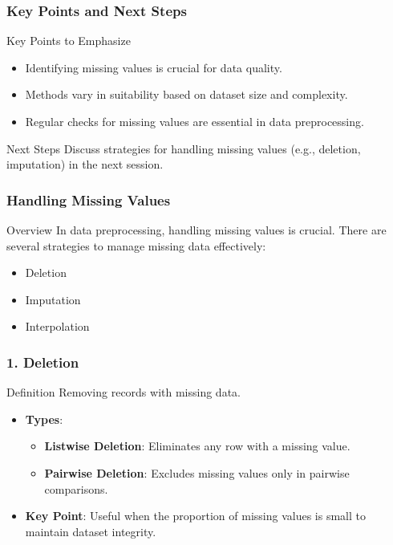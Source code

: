 \documentclass[aspectratio=169]{beamer}
\begin{document}
\begin{frame}[fragile]
  \frametitle{Key Points and Next Steps}
  \begin{block}{Key Points to Emphasize}
    \begin{itemize}
      \item Identifying missing values is crucial for data quality.
      \item Methods vary in suitability based on dataset size and complexity.
      \item Regular checks for missing values are essential in data preprocessing.
    \end{itemize}
  \end{block}
  \begin{block}{Next Steps}
    Discuss strategies for handling missing values (e.g., deletion, imputation) in the next session.
  \end{block}
\end{frame}

\begin{frame}[fragile]
    \frametitle{Handling Missing Values}
    \begin{block}{Overview}
        In data preprocessing, handling missing values is crucial. There are several strategies to manage missing data effectively:
    \end{block}
    \begin{itemize}
        \item Deletion
        \item Imputation
        \item Interpolation
    \end{itemize}
\end{frame}

\begin{frame}[fragile]
    \frametitle{1. Deletion}
    \begin{block}{Definition}
        Removing records with missing data.
    \end{block}
    \begin{itemize}
        \item \textbf{Types}:
        \begin{itemize}
            \item \textbf{Listwise Deletion}: Eliminates any row with a missing value.
            \item \textbf{Pairwise Deletion}: Excludes missing values only in pairwise comparisons.
        \end{itemize}
        \item \textbf{Key Point}: Useful when the proportion of missing values is small to maintain dataset integrity.
    \end{itemize}
\end{frame}
\end{document}
